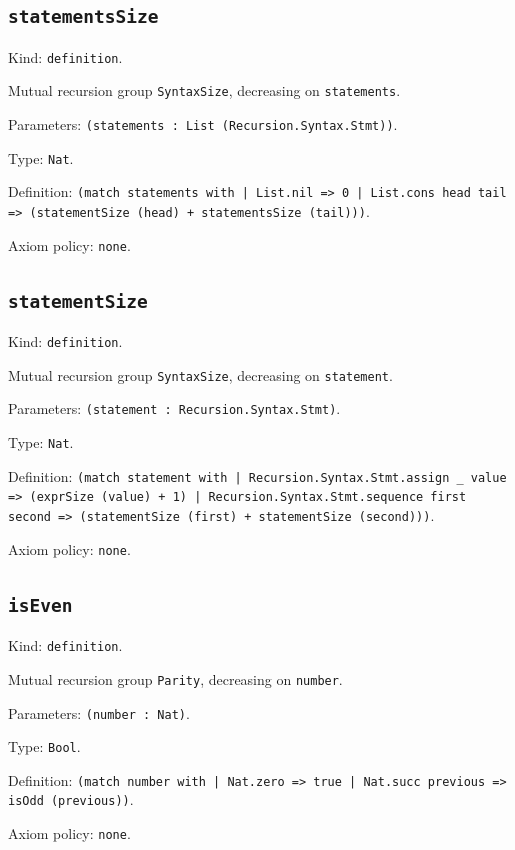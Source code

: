 \documentclass[11pt]{article}
\begin{document}
\subsection*{\texttt{statementsSize}}
\noindent Kind: \texttt{definition}.\par
\noindent Mutual recursion group \texttt{SyntaxSize}, decreasing on \texttt{statements}.\par
\noindent Parameters: \texttt{(statements : List (Recursion.Syntax.Stmt))}.\par
\noindent Type: \texttt{Nat}.\par
\noindent Definition: \texttt{(match statements with | List.nil => 0 | List.cons head tail => (statementSize (head) + statementsSize (tail)))}.\par
\noindent Axiom policy: \texttt{none}.\par
\subsection*{\texttt{statementSize}}
\noindent Kind: \texttt{definition}.\par
\noindent Mutual recursion group \texttt{SyntaxSize}, decreasing on \texttt{statement}.\par
\noindent Parameters: \texttt{(statement : Recursion.Syntax.Stmt)}.\par
\noindent Type: \texttt{Nat}.\par
\noindent Definition: \texttt{(match statement with | Recursion.Syntax.Stmt.assign \_ value => (exprSize (value) + 1) | Recursion.Syntax.Stmt.sequence first second => (statementSize (first) + statementSize (second)))}.\par
\noindent Axiom policy: \texttt{none}.\par
\subsection*{\texttt{isEven}}
\noindent Kind: \texttt{definition}.\par
\noindent Mutual recursion group \texttt{Parity}, decreasing on \texttt{number}.\par
\noindent Parameters: \texttt{(number : Nat)}.\par
\noindent Type: \texttt{Bool}.\par
\noindent Definition: \texttt{(match number with | Nat.zero => true | Nat.succ previous => isOdd (previous))}.\par
\noindent Axiom policy: \texttt{none}.\par
\end{document}
